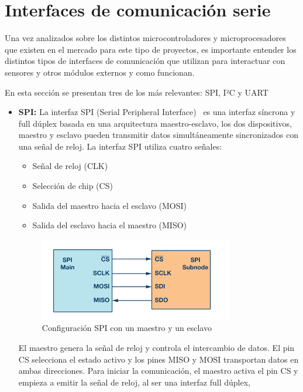 \section{Interfaces de comunicación serie}
Una vez analizados sobre los distintos microcontroladores y microprocesadores que existen en el mercado para este tipo de proyectos,
es importante entender los distintos tipos de interfaces de comunicación que utilizan para interactuar con sensores y otros módulos externos y como funcionan.

En esta sección se presentan tres de los más relevantes: SPI, I²C y UART

\begin{itemize}
    \item \textbf{SPI:} La interfaz SPI (Serial Peripheral Interface)~\cite{dhaker_spi} es una interfaz síncrona y full dúplex basada en una arquitectura maestro-esclavo,
    los dos dispositivos, maestro y esclavo pueden transmitir datos simultáneamente sincronizados con una señal de reloj.
    La interfaz SPI utiliza cuatro señales:
    \begin{itemize}
        \item Señal de reloj (CLK)
        \item Selección de chip (CS)
        \item Salida del maestro hacia el esclavo (MOSI)
        \item Salida del esclavo hacia el maestro (MISO)
    \end{itemize}
    \begin{figure}[h]
        \centering
        \includegraphics[width=0.8\textwidth]{Imagenes/Bitmap/spi}
        \caption{Configuración SPI con un maestro y un esclavo}
        \label{fig:spi}
    \end{figure}
    El maestro genera la señal de reloj y controla el intercambio de datos.
    El pin CS selecciona el estado activo y los pines MISO y MOSI transportan datos en ambas direcciones.
    Para iniciar la comunicación, el maestro activa el pin CS y empieza a emitir la señal de reloj, al ser una interfaz full dúplex,

\end{itemize}
